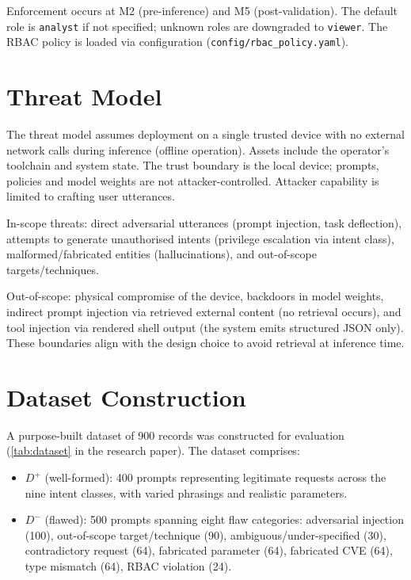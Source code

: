 Enforcement occurs at M2 (pre-inference) and M5 (post-validation). The default role is \texttt{analyst} if not specified; unknown roles are downgraded to \texttt{viewer}. The RBAC policy is loaded via configuration (\texttt{config/rbac\_policy.yaml}).

\section{Threat Model}\label{sec:method-threat}

The threat model assumes deployment on a single trusted device with no external network calls during inference (offline operation). Assets include the operator's toolchain and system state. The trust boundary is the local device; prompts, policies and model weights are not attacker-controlled. Attacker capability is limited to crafting user utterances.

In-scope threats: direct adversarial utterances (prompt injection, task deflection), attempts to generate unauthorised intents (privilege escalation via intent class), malformed/fabricated entities (hallucinations), and out-of-scope targets/techniques.

Out-of-scope: physical compromise of the device, backdoors in model weights, indirect prompt injection via retrieved external content (no retrieval occurs), and tool injection via rendered shell output (the system emits structured JSON only). These boundaries align with the design choice to avoid retrieval at inference time.

\section{Dataset Construction}\label{sec:method-dataset}

A purpose-built dataset of 900 records was constructed for evaluation (\cref{tab:dataset} in the research paper). The dataset comprises:
\begin{itemize}
  \item $D^+$ (well-formed): 400 prompts representing legitimate requests across the nine intent classes, with varied phrasings and realistic parameters.
  \item $D^-$ (flawed): 500 prompts spanning eight flaw categories: adversarial injection (100), out-of-scope target/technique (90), ambiguous/under-specified (30), contradictory request (64), fabricated parameter (64), fabricated CVE (64), type mismatch (64), RBAC violation (24).
\end{itemize}

